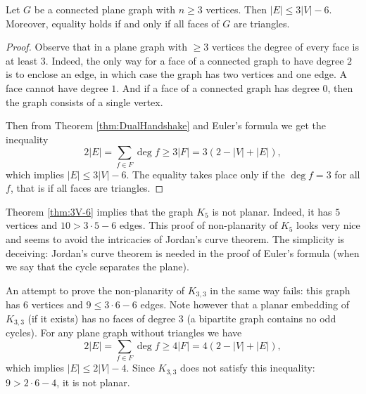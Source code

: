 \begin{page}

\begin{thm}
\label{thm:3V-6}
Let $G$ be a connected plane graph with $n \ge 3$ vertices.
Then $|E| \le 3|V| - 6$.
Moreover, equality holds if and only if all faces of $G$ are triangles.
\end{thm}

\end{page}

\begin{page}

\begin{proof}
Observe that in a plane graph with $\ge 3$ vertices the degree of every face is at least $3$.
Indeed, the only way for a face of a connected graph to have degree $2$ is to enclose an edge, in which case the graph has two vertices and one edge.
A face cannot have degree $1$. And if a face of a connected graph has degree $0$, then the graph consists of a single vertex.

Then from Theorem \ref{thm:DualHandshake} and Euler's formula we get the inequality
\[
2 |E| = \sum_{f \in F} \deg f \ge 3 |F| = 3 (2 - |V| + |E|),
\]
which implies $|E| \le 3|V| - 6$.
The equality takes place only if the $\deg f = 3$ for all $f$, that is if all faces are triangles.
\end{proof}

Theorem \ref{thm:3V-6} implies that the graph $K_5$ is not planar.
Indeed, it has $5$ vertices and $10 > 3\cdot 5 - 6$ edges.
This proof of non-planarity of $K_5$ looks very nice and seems to avoid the intricacies of Jordan's curve theorem.
The simplicity is deceiving: Jordan's curve theorem is needed in the proof of Euler's formula (when we say that the cycle separates the plane).

An attempt to prove the non-planarity of $K_{3,3}$ in the same way fails:
this graph has $6$ vertices and $9 \le 3 \cdot 6 - 6$ edges.
Note however that a planar embedding of $K_{3,3}$ (if it exists) has no faces of degree $3$ (a bipartite graph contains no odd cycles).
For any plane graph without triangles we have
\[
2 |E| = \sum_{f \in F} \deg f \ge 4 |F| = 4 (2 - |V| + |E|),
\]
which implies $|E| \le 2|V| - 4$.
Since $K_{3,3}$ does not satisfy this inequality: $9 > 2 \cdot 6 - 4$, it is not planar.





\end{page}

